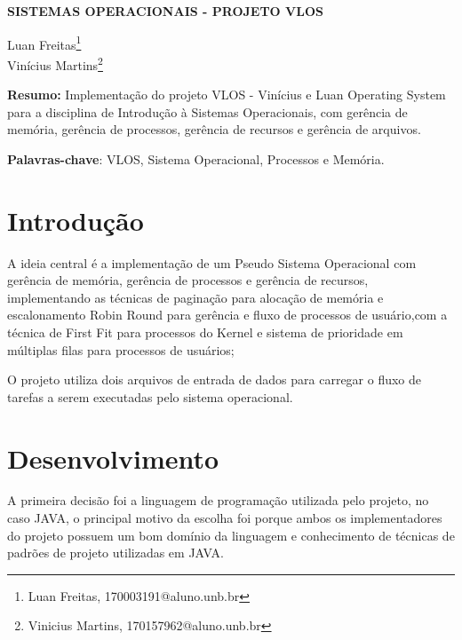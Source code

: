 \documentclass[article,12pt,oneside,a4paper,english,brazil,sumario=tradicional]{abntex2}
\begin{document}
\frenchspacing %

\begin{center}
	\uppercase{\bfseries{Sistemas Operacionais - Projeto VLOS}}
	\vspace{12pt}
\end{center}

\begin{flushright}
	Luan Freitas\footnote{Luan Freitas, 170003191@aluno.unb.br}
	\\
	Vinícius Martins\footnote{Vinicius Martins, 170157962@aluno.unb.br}
	\vspace{12pt}
\end{flushright}

\begin{footnotesize}
\SingleSpacing
\noindent
\small{\textbf{Resumo:}}
\noindent
\small
Implementação do projeto VLOS - Vinícius e Luan Operating System para a disciplina de Introdução à Sistemas Operacionais, com gerência de memória, gerência de processos, gerência de  recursos e gerência de arquivos.

\noindent
\textbf{Palavras-chave}: VLOS, Sistema Operacional, Processos e Memória.
\end{footnotesize}

\textual
\pagestyle{simple}


\section{Introdu\c c\~ao}
\label{secIntroducao}
\normalsize
A ideia central é a implementação de um Pseudo Sistema Operacional com gerência de memória, gerência de processos e gerência de recursos, implementando as técnicas de paginação para alocação de memória e escalonamento Robin Round \cite {maziero2019} para gerência e fluxo de processos de usuário,com a técnica de First Fit \cite {tanebaum2010} para processos do Kernel e sistema de prioridade em múltiplas filas para processos de usuários;

O projeto utiliza dois arquivos de entrada de dados para carregar o fluxo de tarefas a serem executadas pelo sistema operacional.

\section{Desenvolvimento}
A primeira decisão foi a linguagem de programação utilizada pelo projeto, no caso JAVA, o principal motivo da escolha foi porque ambos os implementadores do projeto possuem um bom domínio da linguagem e conhecimento de técnicas de padrões de projeto utilizadas em JAVA.
\end{document}

